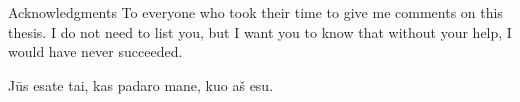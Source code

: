 \begin{abstractpage}{Acknowledgments}
    To everyone who took their time to give me comments on this thesis.
    I do not need to list you, but I want you to know that without your help, I would have never succeeded.
    
    \vfill
    \begin{center}
        Jūs esate tai, kas padaro mane, kuo aš esu.
    \end{center}   
    

\end{abstractpage}
